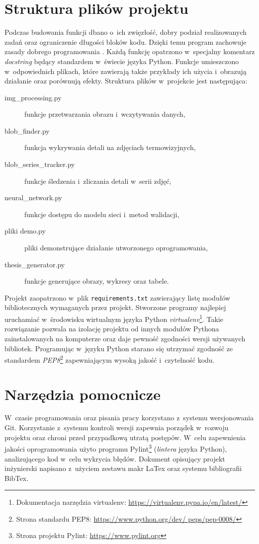 \section{Struktura plików projektu}
Podczas budowania funkcji dbano o~ich zwięzłość, dobry podział realizowanych
zadań oraz ograniczenie długości bloków kodu.
Dzięki temu program zachowuje zasady dobrego programowania \cite{martin_code}.
Każdą funkcję opatrzono w~specjalny komentarz \emph{docstring} będący
standardem w~świecie języka Python.
Funkcje umieszczono w~odpowiednich plikach, które zawierają także
przykłady ich użycia i~obrazują działanie oraz porównują efekty.
Struktura plików w~projekcie jest następująca:
\begin{description}
    \item[img\_processing.py]
          funkcje przetwarzania obrazu i~wczytywania danych,
    \item[blob\_finder.py]
          funkcja wykrywania detali na zdjęciach termowizyjnych,
    \item[blob\_series\_tracker.py]
          funkcje śledzenia i~zliczania detali w~serii zdjęć,
    \item[neural\_network.py]
          funkcje dostępu do modelu sieci i~metod walidacji,
    \item[pliki demo.py]
          pliki demonstrujące działanie utworzonego oprogramowania,
    \item[thesis\_generator.py]
          funkcje generujące obrazy, wykresy oraz tabele.
\end{description}

Projekt zaopatrzono w~plik \texttt{requirements.txt} zawierający listę
modułów bibliotecznych wymaganych przez projekt.
Stworzone programy najlepiej uruchamiać w~środowisku wirtualnym języka
Python \emph{virtualenv}\footnote{Dokumentacja narzędzia virtualenv:
\url{https://virtualenv.pypa.io/en/latest/}}.
Takie rozwiązanie pozwala na izolację projektu od innych modułów Pythona
zainstalowanych na komputerze oraz daje pewność zgodności wersji używanych
bibliotek.
Programując w~języku Python starano się utrzymać zgodność ze standardem
\emph{PEP8}\footnote{Strona standardu PEP8: \url{https://www.python.org/dev/
peps/pep-0008/}} zapewniającym wysoką jakość i~czytelność kodu.

\section{Narzędzia pomocnicze}
W~czasie programowania oraz pisania pracy korzystano z~systemu wersjonowania
Git.
Korzystanie z~systemu kontroli wersji zapewnia porządek w~rozwoju projektu
oraz chroni przed przypadkową utratą postępów.
W~celu zapewnienia jakości oprogramowania użyto programu Pylint\footnote{
Strona projektu Pylint: \url{https://www.pylint.org}} (\emph{lintera}
języka Python), analizującego kod w~celu wykrycia błędów.
Dokument opisujący projekt inżynierski napisano z~użyciem zestawu makr
LaTex oraz systemu bibliografii BibTex.

